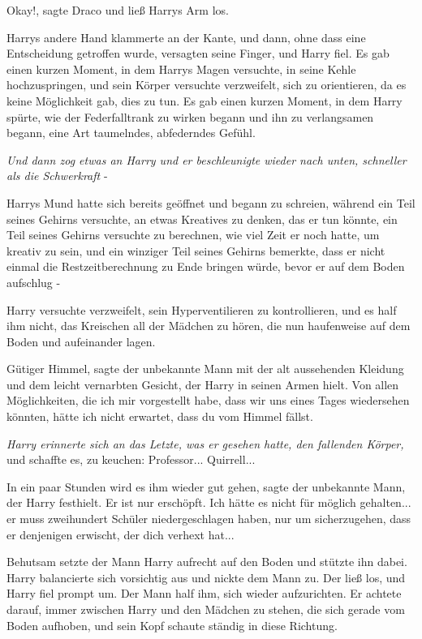 \glqq{}Okay!\grqq{}, sagte Draco und ließ Harrys Arm los.

Harrys andere Hand klammerte an der Kante, und dann, ohne dass eine Entscheidung
getroffen wurde, versagten seine Finger, und Harry fiel. Es gab einen kurzen
Moment, in dem Harrys Magen versuchte, in seine Kehle hochzuspringen, und sein
Körper versuchte verzweifelt, sich zu orientieren, da es keine Möglichkeit gab,
dies zu tun. Es gab einen kurzen Moment, in dem Harry spürte, wie der
Federfalltrank zu wirken begann und ihn zu verlangsamen begann, eine Art
taumelndes, abfederndes Gefühl.

\emph{Und dann zog etwas an Harry und er beschleunigte wieder nach unten,
schneller als die Schwerkraft} -

Harrys Mund hatte sich bereits geöffnet und begann zu schreien, während ein Teil
seines Gehirns versuchte, an etwas Kreatives zu denken, das er tun könnte, ein
Teil seines Gehirns versuchte zu berechnen, wie viel Zeit er noch hatte, um
kreativ zu sein, und ein winziger Teil seines Gehirns bemerkte, dass er nicht
einmal die Restzeitberechnung zu Ende bringen würde, bevor er auf dem Boden
aufschlug -

Harry versuchte verzweifelt, sein Hyperventilieren zu kontrollieren, und es half
ihm nicht, das Kreischen all der Mädchen zu hören, die nun haufenweise auf dem
Boden und aufeinander lagen.

\glqq{}Gütiger Himmel\grqq{}, sagte der unbekannte Mann mit der alt aussehenden
Kleidung und dem leicht vernarbten Gesicht, der Harry in seinen Armen hielt.
\glqq{}Von allen Möglichkeiten, die ich mir vorgestellt habe, dass wir uns eines
Tages wiedersehen könnten, hätte ich nicht erwartet, dass du vom Himmel fällst.\grqq{}

\emph{Harry erinnerte sich an das Letzte, was er gesehen hatte, den fallenden
Körper,} und schaffte es, zu keuchen: \glqq{}Professor... Quirrell...\grqq{}

\glqq{}In ein paar Stunden wird es ihm wieder gut gehen\grqq{}, sagte der
unbekannte Mann, der Harry festhielt. \glqq{}Er ist nur erschöpft. Ich hätte es
nicht für möglich gehalten... er muss zweihundert Schüler niedergeschlagen
haben, nur um sicherzugehen, dass er denjenigen erwischt, der dich verhext
hat...\grqq{}

Behutsam setzte der Mann Harry aufrecht auf den Boden und stützte ihn dabei.
Harry balancierte sich vorsichtig aus und nickte dem Mann zu. Der ließ los, und
Harry fiel prompt um. Der Mann half ihm, sich wieder aufzurichten. Er achtete
darauf, immer zwischen Harry und den Mädchen zu stehen, die sich gerade vom
Boden aufhoben, und sein Kopf schaute ständig in diese Richtung.

